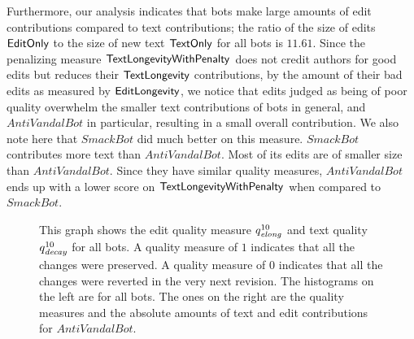 Furthermore, our analysis indicates that bots make large amounts of
edit contributions compared to text contributions; the ratio
of the size of edits $\mathsf{EditOnly}$ to the size of new text $\mathsf{TextOnly}$
for all bots is $11.61$.
Since the penalizing measure $\mathsf{TextLongevityWithPenalty}$ does not credit authors for
good edits but reduces their $\mathsf{TextLongevity}$ contributions, by the 
amount of their bad edits as measured by $\mathsf{EditLongevity}$, we notice that 
edits judged as being of poor quality overwhelm the smaller text 
contributions of bots in general, and $AntiVandalBot$ in particular, 
resulting in a small overall contribution.
We also note here that $SmackBot$ did much better on this
measure.
$SmackBot$ contributes more text than $AntiVandalBot$.
Most of its edits are of smaller size than $AntiVandalBot$.
Since they have similar quality measures, $AntiVandalBot$ ends
up with a lower score on $\mathsf{TextLongevityWithPenalty}$ when compared to $SmackBot$.

%
\begin{figure}[tbhp]
    \begin{center}
    \end{center}
    \caption[Measuring edit and text quality for all bots and $AntiVandalBot$]{
    	This graph shows the edit quality measure $\quality{elong}{10}{}$
        and text quality $\quality{decay}{10}{}$ for all bots.
        A quality measure of $1$ indicates that all the changes
        were preserved.
        A quality measure of $0$ indicates that all the changes
        were reverted in the very next revision.
        The histograms on the left are for all bots.
        The ones on the right are the quality measures and the absolute amounts
        of text and edit contributions for $AntiVandalBot$.
    }
    \label{bot-contribs}
\end{figure}
